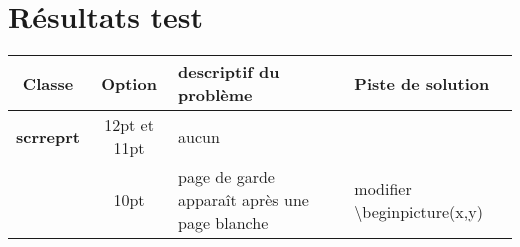 \documentclass[a4paper,12pt]{article}
\begin{document}
\section{Résultats test}
\begin{tabular}{|c|c|p{5cm}|p{5cm}|}
  \hline
  Classe & Option & descriptif du problème & Piste de solution\\\hline
 \bf scrreprt & 12pt et 11pt & aucun & \\\hline
         & 10pt & page de garde apparaît après une page blanche & modifier \textbackslash begin{picture}(x,y)
\\\hline
\end{tabular}
\end{document}
